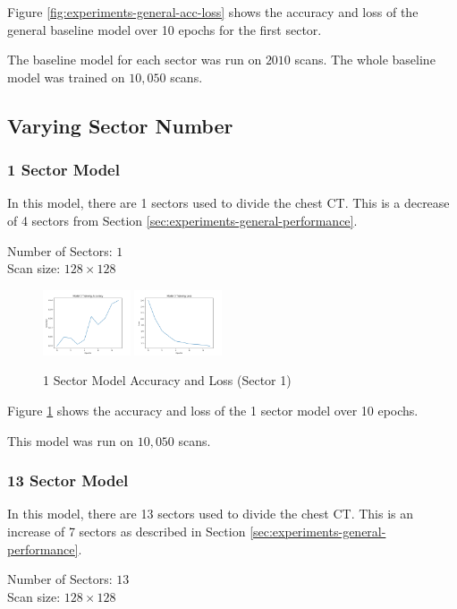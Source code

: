 \documentclass[10pt,twocolumn,letterpaper]{article}
\begin{document}
      Figure \ref{fig:experiments-general-acc-loss} shows the accuracy and loss of the general baseline model over 10 epochs for the first sector.

      The baseline model for each sector was run on $2010$ scans. The whole baseline model was trained on $10,050$ scans.
   \subsection{Varying Sector Number} \label{sec:experiments-sector}
      \subsubsection{1 Sector Model} \label{sec:experiments-sector-13}
         In this model, there are 1 sectors used to divide the chest CT. This is a decrease of 4 sectors from Section \ref{sec:experiments-general-performance}.
         \begin{center}
            Number of Sectors: $1$ \\
            Scan size: $128 \times 128$
         \end{center}

         \begin{figure}[h]
            \centering
            \includegraphics[width=0.23\textwidth]{./images/training_accuracy_1_sector_128_px.png}
            \includegraphics[width=0.23\textwidth]{./images/training_loss_1_sector_128_px.png}
            \caption{1 Sector Model Accuracy and Loss (Sector 1)}
            \label{fig:experiments-1-sector-acc-loss}
         \end{figure}

         Figure \ref{fig:experiments-1-sector-acc-loss} shows the accuracy and loss of the 1 sector model over 10 epochs.

         This model was run on $10,050$ scans.

      \subsubsection{13 Sector Model} \label{sec:experiments-sector-13}
         In this model, there are 13 sectors used to divide the chest CT. This is an increase of 7 sectors as described in Section \ref{sec:experiments-general-performance}.
         \begin{center}
            Number of Sectors: $13$ \\
            Scan size: $128 \times 128$
         \end{center}
\end{document}
